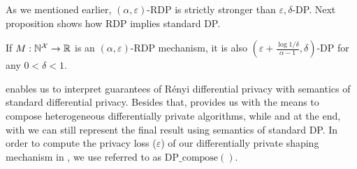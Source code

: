 As we mentioned earlier, $(\alpha, \varepsilon)$-RDP is strictly stronger than $\varepsilon, \delta$-DP. 
Next proposition shows how RDP implies standard DP.
\begin{proposition}\label{prop:rdp-better-than-dp}
  If $M: \mathbb{N}^\mathcal{X} \rightarrow \mathbb{R}$ is an $(\alpha, \varepsilon)$-RDP mechanism, it is also $(\varepsilon + \frac{\log 1/\delta}{\alpha-1}, \delta)$-DP for any $0 < \delta < 1$. 
\end{proposition}
\noindent {} enables us to interpret guarantees of R\'enyi differential privacy with semantics of standard differential privacy. 
Besides that,  provides us with the means to compose heterogeneous differentially private algorithms, while and at the end, with  we can still represent the final result using semantics of standard DP. 
In order to compute the privacy loss (\ie $\varepsilon$) of our differentially private shaping mechanism in , we use  referred to as $\textrm{DP\_compose}()$.